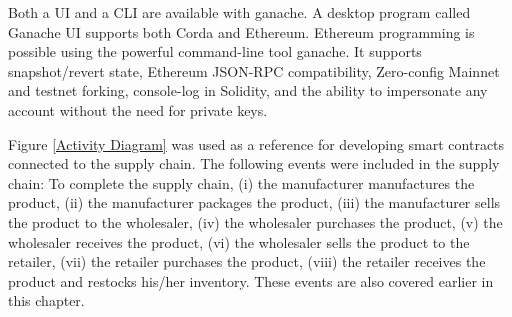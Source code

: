 \vspace{.5cm}

Both a \ac{UI} and a \ac{CLI} are available with ganache. A desktop program called Ganache \ac{UI} supports both Corda and Ethereum. Ethereum programming is possible using the powerful command-line tool ganache. It supports snapshot/revert state, Ethereum JSON-RPC compatibility, Zero-config Mainnet and testnet forking, console-log in Solidity, and the ability to impersonate any account without the need for private keys.

\begin{table}[h]
\small
\centering
\caption{Package Version}
\label{Package Version}
\end{table}

\vspace{.5cm}

Figure \ref{Activity Diagram} was used as a reference for developing smart contracts connected to the supply chain. The following events were included in the supply chain: To complete the supply chain, (i) the manufacturer manufactures the product, (ii) the manufacturer packages the product, (iii) the manufacturer sells the product to the wholesaler, (iv) the wholesaler purchases the product, (v) the wholesaler receives the product, (vi) the wholesaler sells the product to the retailer, (vii) the retailer purchases the product, (viii) the retailer receives the product and restocks his/her inventory. These events are also covered earlier in this chapter.

